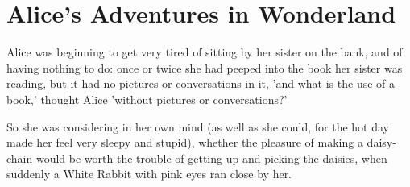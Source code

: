 \documentclass[12pt]{article}
\begin{document}
\section{Alice's Adventures in Wonderland}
Alice was beginning to get very tired of sitting by her sister on the
bank, and of having nothing to do: once or twice she had peeped into the
book her sister was reading, but it had no pictures or conversations in
it, 'and what is the use of a book,' thought Alice 'without pictures or
conversations?'

So she was considering in her own mind (as well as she could, for the
hot day made her feel very sleepy and stupid), whether the pleasure
of making a daisy-chain would be worth the trouble of getting up and
picking the daisies, when suddenly a White Rabbit with pink eyes ran
close by her.
\end{document}
